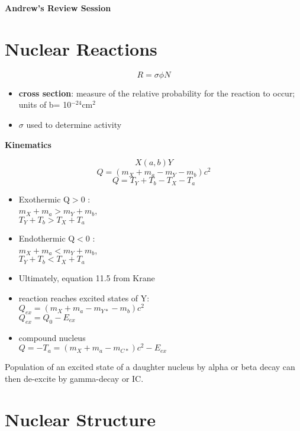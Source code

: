 \documentclass[letter]{article}
\begin{document}
\textbf{\Large{Andrew's Review Session}} \\
\vspace{12pt}


\section{Nuclear Reactions}

\begin{equation}
R= \sigma \phi N
\end{equation}

\begin{itemize}
\item \textbf{cross section}: measure of the relative probability for the reaction to occur; units of b= 10$^{-24}$cm$^{2}$
\item $\sigma$ used to determine activity 
\end{itemize}

\textbf{Kinematics}


$$X(a,b)Y$$
$$Q= (m_{X}+m_{a}-m_{Y}-m_{b})c^{2}$$
$$Q =T_{Y}+T_{b}-T_{X}-T_{a}$$

\begin{itemize}
\item Exothermic Q$>$0 : \\$m_{X}+m_{a}>m_{Y}+m_{b}$,\\ $T_{Y}+T_{b}>T_{X}+T_{a}$
\item Endothermic Q$<$0 : \\$m_{X}+m_{a}<m_{Y}+m_{b}$,\\ $T_{Y}+T_{b}<T_{X}+T_{a}$
\item Ultimately, equation 11.5 from Krane
\item reaction reaches excited states of Y: \\ $Q_{ex} = (m_{X}+m_{a}-m_{Y*}-m_{b})c^{2}$\\$Q_{ex} = Q_{0}-E_{ex}$
\item compound nucleus \\ $Q = -T_{a} = (m_{X}+m_{a}-m_{C*})c^{2}-E_{ex}$
\end{itemize}

Population of an excited state of a daughter nucleus by alpha or beta decay can then de-excite by gamma-decay or IC.

\section{Nuclear Structure}
\end{document}
